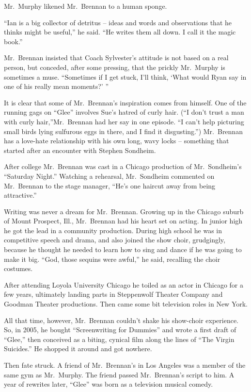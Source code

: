 ﻿\documentclass[12pt]{article}
\begin{document}
Mr.~Murphy likened Mr.~Brennan to a human sponge.

``Ian is a big collector of detritus -- ideas and words and observations that he thinks might be
useful,'' he said. ``He writes them all down. I call it the magic book.''

Mr.~Brennan insisted that Coach Sylvester's attitude is not based on a real person, but conceded,
after some pressing, that the prickly Mr.~Murphy is sometimes a muse. ``Sometimes if I get stuck,
I'll think, `What would Ryan say in one of his really mean moments?' ''

It is clear that some of Mr.~Brennan's inspiration comes from himself. One of the running gags on
``Glee'' involves Sue's hatred of curly hair. (``I don't trust a man with curly hair,''Mr.~Brennan
had her say in one episode. ``I can't help picturing small birds lying sulfurous eggs in there, and
I find it disgusting.'') Mr.~Brennan has a love-hate relationship with his own long, wavy locks --
something that started after an encounter with Stephen Sondheim.

After college Mr.~Brennan was cast in a Chicago production of Mr.~Sondheim's ``Saturday Night.''
Watching a rehearsal, Mr.~Sondheim commented on Mr.~Brennan to the stage manager, ``He's one haircut
away from being attractive.''

Writing was never a dream for Mr.~Brennan. Growing up in the Chicago suburb of Mount Prospect, Ill.,
Mr.~Brennan had his heart set on acting. In junior high he got the lead in a community production.
During high school he was in competitive speech and drama, and also joined the show choir,
grudgingly, because he thought he needed to learn how to sing and dance if he was going to make it
big. ``God, those sequins were awful,'' he said, recalling the choir costumes.

After attending Loyola University Chicago he toiled as an actor in Chicago for a few years,
ultimately landing parts in Steppenwolf Theater Company and Goodman Theater productions. Then came
some bit television roles in New York.

All that time, however, Mr.~Brennan couldn't shake his show-choir experience. So, in 2005, he bought
``Screenwriting for Dummies'' and wrote a first draft of ``Glee,'' then conceived as a biting,
cynical film along the lines of ``The Virgin Suicides.'' He shopped it around and got nowhere.

Then fate struck. A friend of Mr.~Brennan's in Los Angeles was a member of the same gym as
Mr.~Murphy. The friend passed Mr.~Brennan's script to him. A year of rewrites later, ``Glee'' was
born as a television musical comedy.
\end{document}
